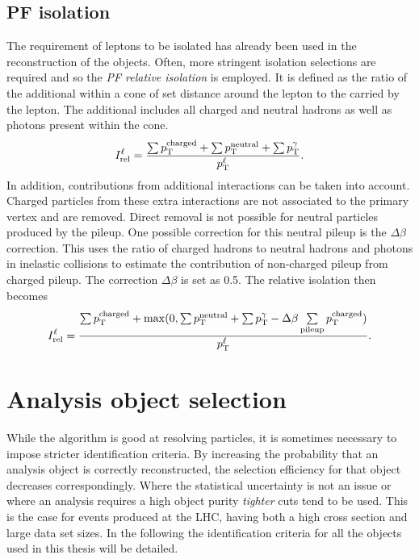 \subsection{PF isolation} %
\label{sub:pf_isolation}

The requirement of leptons to be isolated has already been used in the reconstruction of the \PF{} objects.
Often, more stringent isolation selections are required and so the \textit{PF relative isolation} \Irel{} is employed.
It is defined as the ratio of the additional \pt{} within a cone of set distance around the lepton to the \pt{} carried by the lepton.
The additional \pt{} includes all charged and neutral hadrons as well as photons present within the cone.
\begin{equation}
\label{eq:pfiso}
	I_{\mathrm{rel}}^{\ell} = \frac{\sum p_{\mathrm{T}}^{\mathrm{charged}} + \sum p_{\mathrm{T}}^{\mathrm{neutral}} + \sum p_{\mathrm{T}}^{\gamma}}{p_{\mathrm{T}}^{\ell}}.
\end{equation}
In addition, contributions from additional interactions can be taken into account.
Charged particles from these extra interactions are not associated to the primary vertex and are removed.
Direct removal is not possible for neutral particles produced by the pileup.
One possible correction for this neutral pileup is the $\Delta\beta$ correction.
This uses the ratio of charged hadrons to neutral hadrons and photons in inelastic collisions to estimate the contribution of non-charged pileup from charged pileup.
The correction $\Delta\beta$ is set as 0.5.
The relative isolation then becomes
\begin{equation}
\label{eq:pfiso}
	I_{\mathrm{rel}}^{\ell} = \frac{\sum p_{\mathrm{T}}^{\mathrm{charged}} + \max(0, \sum p_{\mathrm{T}}^{\mathrm{neutral}} + \sum p_{\mathrm{T}}^{\gamma} - \Delta\beta\sum\limits^{}_{\mathrm{pileup}}p_{\mathrm{T}}^{\mathrm{charged}})}{p_{\mathrm{T}}^{\ell}}.
\end{equation}

\section{Analysis object selection}
\label{sec:analysis_objects}

While the \PF{} algorithm is good at resolving particles, it is sometimes necessary to impose stricter identification criteria.
By increasing the probability that an analysis object is correctly reconstructed, the selection efficiency for that object decreases correspondingly.
Where the statistical uncertainty is not an issue or where an analysis requires a high object purity \textit{tighter} cuts tend to be used.
This is the case for \ttbar{} events produced at the LHC, having both a high cross section and large data set sizes.
In the following the identification criteria for all the objects used in this thesis will be detailed.

